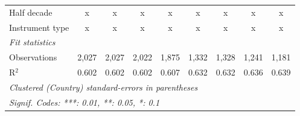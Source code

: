 \begin{tabular}{lcccccccc}
   Half decade                                                & x             & x             & x             & x             & x             & x             & x             & x\\  
   Instrument type                                            & x             & x             & x             & x             & x             & x             & x             & x\\  
   \midrule \emph{Fit statistics}\\
   Observations                                               & 2,027         & 2,027         & 2,022         & 1,875         & 1,332         & 1,328         & 1,241         & 1,181\\  
   R$^2$                                                      & 0.602         & 0.602         & 0.602         & 0.607         & 0.632         & 0.632         & 0.636         & 0.639\\  
   \midrule
   \multicolumn{9}{l}{\emph{Clustered (Country) standard-errors in parentheses}}\\
   \multicolumn{9}{l}{\emph{Signif. Codes: ***: 0.01, **: 0.05, *: 0.1}}\\
\end{tabular}
\par\endgroup


